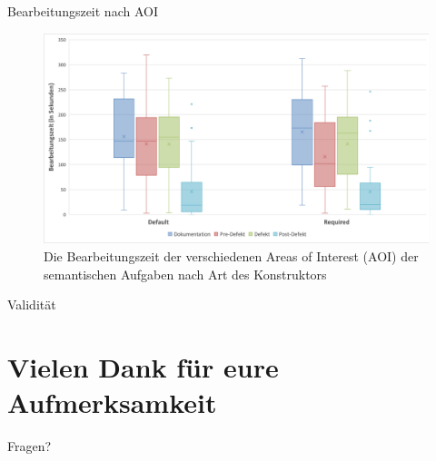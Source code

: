 \documentclass[10pt]{beamer}
\begin{document}
	\begin{frame}{Bearbeitungszeit nach AOI}
		\begin{figure}
			\includegraphics[scale=0.39]{graphics/box_time-aoi_sem.png}
			\caption{\label{fig:box_time-aoi_sem.png} Die Bearbeitungszeit der verschiedenen Areas of Interest (AOI) der semantischen Aufgaben nach Art des Konstruktors}
		\end{figure}
	\end{frame}

	\begin{frame}{Validität}

	\end{frame}	

\section{Vielen Dank für eure Aufmerksamkeit}

\appendix

	\begin{frame}[standout]
		Fragen?
	\end{frame}


%		
%		


\end{document}
